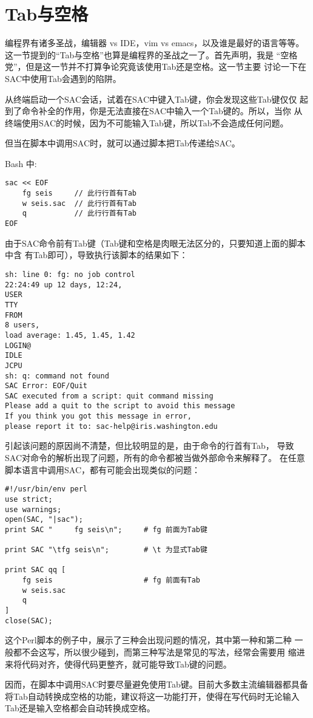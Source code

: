 \section{Tab与空格}
编程界有诸多圣战，编辑器 vs IDE，vim vs emacs，以及谁是最好的语言等等。
这一节提到的``Tab与空格''也算是编程界的圣战之一了。首先声明，我是
``空格党''，但是这一节并不打算争论究竟该使用Tab还是空格。这一节主要
讨论一下在SAC中使用Tab会遇到的陷阱。

从终端启动一个SAC会话，试着在SAC中键入Tab键，你会发现这些Tab键仅仅
起到了命令补全的作用，你是无法直接在SAC中输入一个Tab键的。所以，当你
从终端使用SAC的时候，因为不可能输入Tab键，所以Tab不会造成任何问题。

但当在脚本中调用SAC时，就可以通过脚本把Tab传递给SAC。

Bash 中:
\begin{verbatim}
sac << EOF
    fg seis     // 此行行首有Tab
    w seis.sac  // 此行行首有Tab
    q           // 此行行首有Tab
EOF
\end{verbatim}
由于SAC命令前有Tab键（Tab键和空格是肉眼无法区分的，只要知道上面的脚本中含
有Tab即可），导致执行该脚本的结果如下：
\begin{verbatim}
sh: line 0: fg: no job control
22:24:49 up 12 days, 12:24,
USER
TTY
FROM
8 users,
load average: 1.45, 1.45, 1.42
LOGIN@
IDLE
JCPU
sh: q: command not found
SAC Error: EOF/Quit
SAC executed from a script: quit command missing
Please add a quit to the script to avoid this message
If you think you got this message in error,
please report it to: sac-help@iris.washington.edu
\end{verbatim}

引起该问题的原因尚不清楚，但比较明显的是，由于命令的行首有Tab，
导致SAC对命令的解析出现了问题，所有的命令都被当做外部命令来解释了。
在任意脚本语言中调用SAC，都有可能会出现类似的问题：
\begin{verbatim}
#!/usr/bin/env perl
use strict;
use warnings;
open(SAC, "|sac");
print SAC "     fg seis\n";     # fg 前面为Tab键

print SAC "\tfg seis\n";        # \t 为显式Tab键

print SAC qq [
    fg seis                     # fg 前面有Tab
    w seis.sac
    q
]
close(SAC);
\end{verbatim}
这个Perl脚本的例子中，展示了三种会出现问题的情况，其中第一种和第二种
一般都不会这写，所以很少碰到，而第三种写法是常见的写法，经常会需要用
缩进来将代码对齐，使得代码更整齐，就可能导致Tab键的问题。

因而，在脚本中调用SAC时要尽量避免使用Tab键。目前大多数主流编辑器都具备
将Tab自动转换成空格的功能，建议将这一功能打开，使得在写代码时无论输入
Tab还是输入空格都会自动转换成空格。
